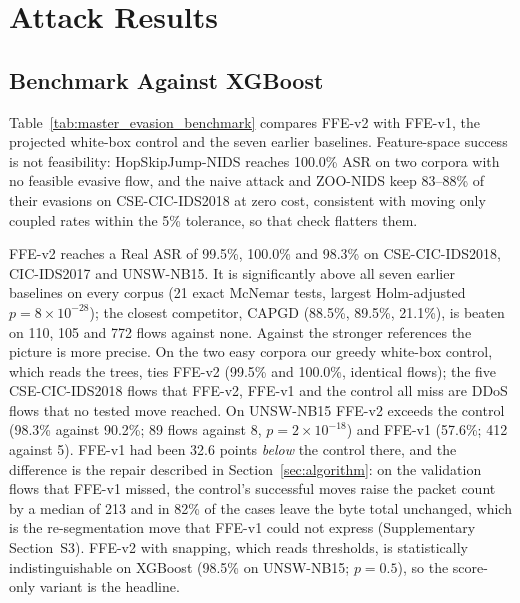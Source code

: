 \section{Attack Results}
\label{sec:results}

\subsection{Benchmark Against XGBoost}
\label{sec:master}

\begin{table}[!htbp]
\linespread{1}\selectfont
\centering
\caption{Evasion benchmark against CUDA XGBoost on the full corpora. All methods except MOEVA and PSO attack the same 1,000 detected malicious test flows; MOEVA and PSO attack the first 200 of them. PFR: share of evasive candidates that are schema-feasible; Op.\ cost and $D_{L_1}$: medians over the method's own feasible evasions. FFE-v1 reads thresholds, the control reads the trees, FFE-v2 (bold) reads scores only.}\label{tab:master_evasion_benchmark}
\resizebox{\textwidth}{!}{%
%
}
\end{table}

Table~\ref{tab:master_evasion_benchmark} compares FFE-v2 with FFE-v1, the projected white-box control and the seven earlier baselines. Feature-space success is not feasibility: HopSkipJump-NIDS reaches 100.0\% ASR on two corpora with no feasible evasive flow, and the naive attack and ZOO-NIDS keep 83--88\% of their evasions on CSE-CIC-IDS2018 at zero cost, consistent with moving only coupled rates within the 5\% tolerance, so that check flatters them.

FFE-v2 reaches a Real ASR of 99.5\%, 100.0\% and 98.3\% on CSE-CIC-IDS2018, CIC-IDS2017 and UNSW-NB15. It is significantly above all seven earlier baselines on every corpus (21 exact McNemar tests, largest Holm-adjusted $p=8\times10^{-28}$); the closest competitor, CAPGD (88.5\%, 89.5\%, 21.1\%), is beaten on 110, 105 and 772 flows against none. Against the stronger references the picture is more precise. On the two easy corpora our greedy white-box control, which reads the trees, ties FFE-v2 (99.5\% and 100.0\%, identical flows); the five CSE-CIC-IDS2018 flows that FFE-v2, FFE-v1 and the control all miss are DDoS flows that no tested move reached. On UNSW-NB15 FFE-v2 exceeds the control (98.3\% against 90.2\%; 89 flows against 8, $p=2\times10^{-18}$) and FFE-v1 (57.6\%; 412 against 5). FFE-v1 had been 32.6 points \emph{below} the control there, and the difference is the repair described in Section~\ref{sec:algorithm}: on the validation flows that FFE-v1 missed, the control's successful moves raise the packet count by a median of 213 and in 82\% of the cases leave the byte total unchanged, which is the re-segmentation move that FFE-v1 could not express (Supplementary Section~S3). FFE-v2 with snapping, which reads thresholds, is statistically indistinguishable on XGBoost (98.5\% on UNSW-NB15; $p=0.5$), so the score-only variant is the headline.


